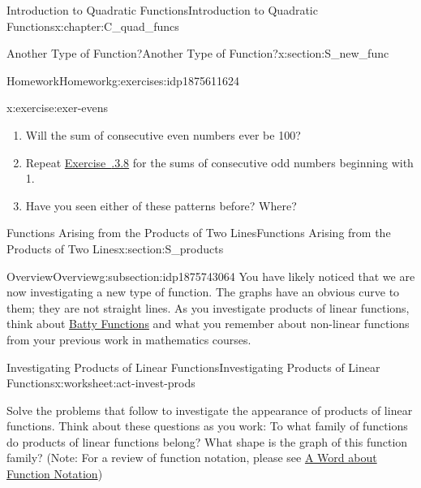 \documentclass[oneside,10pt,]{book}
\newcommand{\xreffont}{\relax}
\numberwithin{equation}{chapter}
\begin{document}
\begin{chapterptx}{Introduction to Quadratic Functions}{}{Introduction to Quadratic Functions}{}{}{x:chapter:C_quad_funcs}
\begin{sectionptx}{Another Type of Function?}{}{Another Type of Function?}{}{}{x:section:S_new_func}
\begin{exercises-subsection}{Homework}{}{Homework}{}{}{g:exercises:idp1875611624}
\begin{divisionexercise}{8}{}{}{x:exercise:exer-evens}
\begin{enumerate}[font=\bfseries,label=(\alph*),ref=\alph*]
\item{}Will the sum of consecutive even numbers ever be 100?%
\item{}Repeat \hyperlink{x:exercise:exer-evens}{Exercise~{\xreffont 4.1.3.8}} for the sums of consecutive odd numbers beginning with 1.%
\item{}Have you seen either of these patterns before? Where?%
\end{enumerate}
\end{divisionexercise}%
\end{exercises-subsection}
\end{sectionptx}
%
%
\typeout{************************************************}
\typeout{************************************************}
%
\begin{sectionptx}{Functions Arising from the Products of Two Lines}{}{Functions Arising from the Products of Two Lines}{}{}{x:section:S_products}
%
%
\typeout{************************************************}
\typeout{************************************************}
%
\begin{subsectionptx}{Overview}{}{Overview}{}{}{g:subsection:idp1875743064}
You have likely noticed that we are now investigating a new type of function. The graphs have an obvious curve to them; they are not straight lines. As you investigate products of linear functions, think about \hyperref[x:worksheet:act-batty-func]{Batty Functions} and what you remember about non-linear functions from your previous work in mathematics courses.%
\end{subsectionptx}
%
%
\typeout{************************************************}
\typeout{************************************************}
%
\begin{worksheet-subsection}{Investigating Products of Linear Functions}{}{Investigating Products of Linear Functions}{}{}{x:worksheet:act-invest-prods}
\begin{introduction}{}%
Solve the problems that follow to investigate the appearance of products of linear functions. Think about these questions as you work: To what family of functions do products of linear functions belong? What shape is the graph of this function family? (Note: For a review of function notation, please see \hyperlink{x:paragraphs:function-notation}{A Word about Function Notation})%

\end{introduction}
\end{worksheet-subsection}
\end{sectionptx}
\end{chapterptx}
\end{document}
